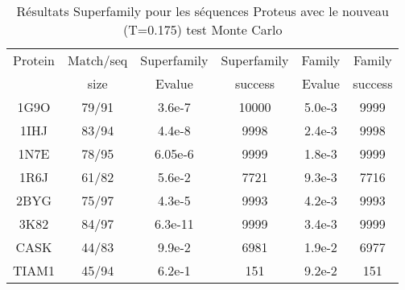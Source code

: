     \begin{table}[h]
           \raggedleft{}

      \begin{tabular}{cccccc}

        \toprule
        Protein & Match/seq & Superfamily & Superfamily & Family & Family \\
                & size      & Evalue      & success     & Evalue & success\\
        \cmidrule{1-6}
        1G9O  & 79/91 & 3.6e-7   &  10000 & 5.0e-3 &  9999  \\
        1IHJ  & 83/94 & 4.4e-8   &  9998  & 2.4e-3 &  9998  \\
        1N7E  & 78/95 & 6.05e-6  &  9999  & 1.8e-3 & 9999   \\
        1R6J  & 61/82 & 5.6e-2   &  7721  & 9.3e-3 &  7716  \\
        2BYG  & 75/97 & 4.3e-5   &  9993  & 4.2e-3 &  9993  \\
        3K82  & 84/97 & 6.3e-11  &  9999  & 3.4e-3 &  9999  \\
        CASK  & 44/83 & 9.9e-2   &  6981  & 1.9e-2 &  6977  \\
        TIAM1 & 45/94 & 6.2e-1   &  151   & 9.2e-2 &  151  \\
        \bottomrule        
      \end{tabular}   
     \caption{Résultats Superfamily pour les séquences Proteus avec le nouveau (T=0.175) test Monte Carlo}   
\label{tab:superfamily_Old_MCtest}       
\end{table}




